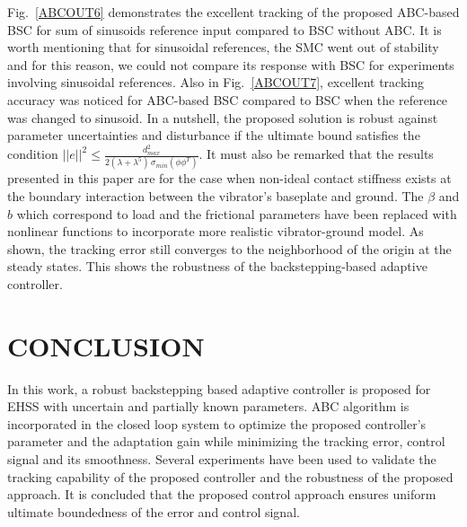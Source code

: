 \documentclass{article} %
\begin{document}
Fig.~\ref{ABCOUT6} demonstrates the excellent tracking of the proposed ABC-based BSC for sum of sinusoids reference input compared to BSC without ABC. It is worth mentioning that for sinusoidal references, the SMC went out of stability and for this reason, we could not compare its response with BSC for experiments involving sinusoidal references. Also in Fig.~\ref{ABCOUT7}, excellent tracking accuracy was noticed for ABC-based BSC compared to BSC when the reference was changed to sinusoid. In a nutshell, the proposed solution is robust against parameter uncertainties and disturbance if the ultimate bound satisfies the condition $||e||^2 \leq \frac{d_{max}^2}{2 \left(\lambda+\lambda^{5}\right)\,\sigma_{min}(\phi \phi^T)}$.  It must also be remarked that the results presented in this paper are for the case when non-ideal contact stiffness exists at the boundary interaction between the vibrator's baseplate and ground.  The $\beta$ and $b$ which correspond to load and the frictional parameters have been replaced with nonlinear functions to incorporate more realistic vibrator-ground model. As shown, the tracking error still converges to the neighborhood of the origin at the steady states. This shows the robustness of the backstepping-based adaptive controller.
\section{CONCLUSION}
In this work, a robust backstepping based adaptive controller is proposed for EHSS with uncertain and partially known parameters.
ABC algorithm is incorporated in the closed loop system to optimize the proposed controller's parameter and the adaptation gain while
minimizing the tracking error, control signal and its smoothness. Several experiments have been used to validate the tracking capability of the proposed controller and the robustness of the proposed approach. It is concluded that the proposed control approach ensures uniform ultimate boundedness of the error and control signal.


\end{document}
